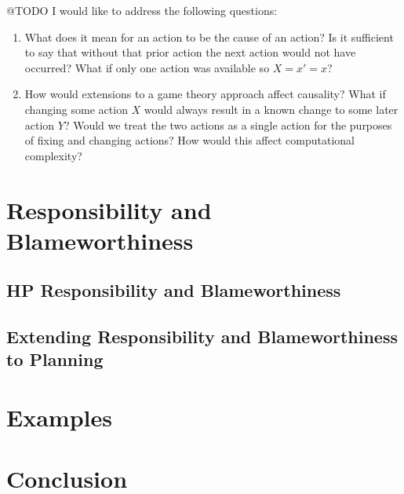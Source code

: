 \documentclass{article}
\theoremstyle{plain}
\theoremstyle{definition}
\begin{document}
@TODO I would like to address the following questions:

\begin{enumerate}
\item What does it mean for an action to be the cause of an action? Is it sufficient to say that without that prior action the next action would not have occurred? What if only one action was available so $X=x'=x$?
\item How would extensions to a game theory approach affect causality? What if changing some action $X$ would always result in a known change to some later action $Y$? Would we treat the two actions as a single action for the purposes of fixing and changing actions? How would this affect computational complexity?
\end{enumerate}



\section{Responsibility and Blameworthiness}
\subsection{HP Responsibility and Blameworthiness}
\subsection{Extending Responsibility and Blameworthiness to Planning}

\fi

\section{Examples}

\section{Conclusion}
\end{document}

